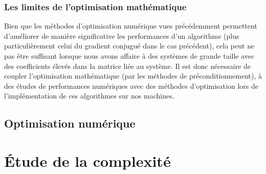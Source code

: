 \subsubsection{Les limites de l'optimisation mathématique}

Bien que les méthodes d'optimisation numérique vues précédemment permettent d'améliorer de manière significative les performances d'un algorithme (plus particulièrement celui du gradient conjugué dans le cas précédent), cela peut ne pas être suffisant lorsque nous avons affaire à des systèmes de grande taille avec des coefficients élevés dans la matrice liée au système. Il est donc nécessaire de coupler l'optimisation mathématique (par les méthodes de préconditionnement), à des études de performances numériques avec des méthodes d'optimisation lors de l'implémentation de ces algorithmes sur nos machines.
\subsection{Optimisation numérique}

\section{Étude de la complexité}
